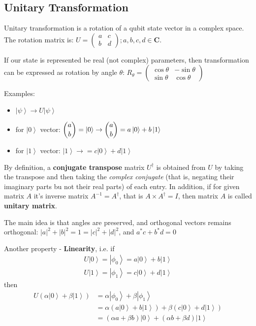 \documentclass{scrartcl}
\newcommand{\ket}[1]{\left| #1 \right>} %
\begin{document}
\subsection{Unitary Transformation}
\label{sec:5-3}

Unitary transformation is a rotation of a qubit state vector in a complex space.
The rotation matrix is: $U = \begin{pmatrix} a & c \\ b & d \end{pmatrix}; a, b,
c, d \in \mathbf{C}$.

If our state is represented be real (not complex) parameters, then
transformation can be expressed as rotation by angle $\theta$: $R_\theta =
\begin{pmatrix} \cos \theta & -\sin\theta \\ \sin\theta &
  \cos\theta \end{pmatrix}$

Examples:
\begin{itemize}
\item $\ket\psi \to U\ket\psi$
\item for $\ket0$ vector: $ \dbinom{a}{b} = \ket0 \to \dbinom ab = a\ket0 + b
  \ket1$
\item for $\ket1$ vector: $\ket1 \to = c\ket0 + d \ket1$
\end{itemize}

By definition, a {\bf conjugate transpose} matrix $U^\dag$ is obtained from $U$
by taking the transpose and then taking the {\it complex conjugate} (that is,
negating their imaginary parts bu not their real parts) of each entry. In
addition, if for given matrix $A$ it's inverse matrix $A^{-1} = A^\dag$, that is
$A \times A^\dag = I$, then matrix $A$ is called {\bf unitary matrix}.

The main idea is that angles are preserved, and orthogonal vectors remains
orthogonal: $|a|^2 + |b|^2 = 1 = |c|^2 + |d|^2$, and $a^*c + b^*d = 0$

Another property - {\bf Linearity}, i.e. if
\begin{gather*}
  U\ket0 = \ket{\phi_0} = a\ket0 + b \ket1 \\
  U\ket1 = \ket{\phi_1} = c\ket0 + d \ket1 \end{gather*} then
\[\begin{split}
  U(\alpha \ket0 + \beta \ket1) &= \alpha\ket{\phi_0} + \beta\ket{\phi_1} \\ &=
  \alpha (a\ket0 + b \ket1) + \beta (c\ket0 + d\ket1) \\ &= (\alpha a + \beta b)
  \ket0 + (\alpha b + \beta d) \ket1 \end{split}\]
\end{document}
